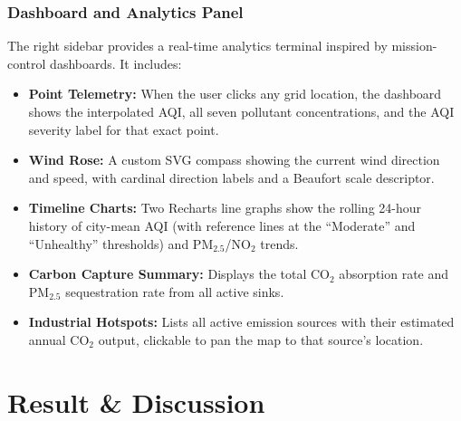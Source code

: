 \documentclass[a4paper, 12pt]{report}
\begin{document}
\subsection{Dashboard and Analytics Panel}
The right sidebar provides a real-time analytics terminal inspired by mission-control dashboards. It includes:

\begin{itemize}
\item \textbf{Point Telemetry:} When the user clicks any grid location, the dashboard shows the interpolated AQI, all seven pollutant concentrations, and the AQI severity label for that exact point.
\item \textbf{Wind Rose:} A custom SVG compass showing the current wind direction and speed, with cardinal direction labels and a Beaufort scale descriptor.
\item \textbf{Timeline Charts:} Two Recharts line graphs show the rolling 24-hour history of city-mean AQI (with reference lines at the ``Moderate'' and ``Unhealthy'' thresholds) and PM$_{2.5}$/NO$_2$ trends.
\item \textbf{Carbon Capture Summary:} Displays the total CO$_2$ absorption rate and PM$_{2.5}$ sequestration rate from all active sinks.
\item \textbf{Industrial Hotspots:} Lists all active emission sources with their estimated annual CO$_2$ output, clickable to pan the map to that source's location.
\end{itemize}
\chapter{Result \& Discussion}
\end{document}
